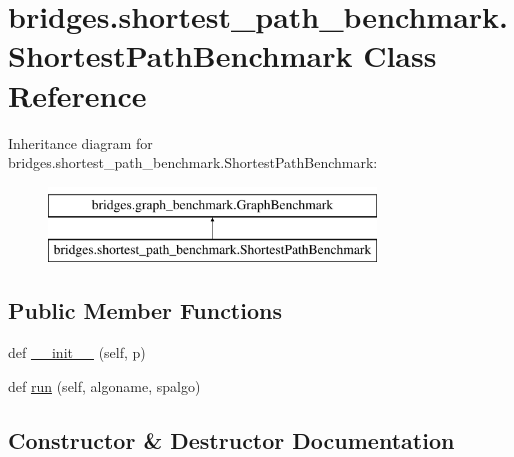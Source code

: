 \hypertarget{classbridges_1_1shortest__path__benchmark_1_1_shortest_path_benchmark}{}\section{bridges.\+shortest\+\_\+path\+\_\+benchmark.\+Shortest\+Path\+Benchmark Class Reference}
\label{classbridges_1_1shortest__path__benchmark_1_1_shortest_path_benchmark}
Inheritance diagram for bridges.\+shortest\+\_\+path\+\_\+benchmark.\+Shortest\+Path\+Benchmark\+:\begin{figure}[H]
\begin{center}
\leavevmode
\includegraphics[height=2.000000cm]{classbridges_1_1shortest__path__benchmark_1_1_shortest_path_benchmark}
\end{center}
\end{figure}
\subsection*{Public Member Functions}
\begin{DoxyCompactItemize}
\item 
def \mbox{\hyperlink{classbridges_1_1shortest__path__benchmark_1_1_shortest_path_benchmark_a708778696f57647d5f8bf94e37297362}{\+\_\+\+\_\+init\+\_\+\+\_\+}} (self, p)
\item 
def \mbox{\hyperlink{classbridges_1_1shortest__path__benchmark_1_1_shortest_path_benchmark_aba41366eff6ee3281ba4decd8d57b089}{run}} (self, algoname, spalgo)
\end{DoxyCompactItemize}


\subsection{Constructor \& Destructor Documentation}
\mbox{\label{classbridges_1_1shortest__path__benchmark_1_1_shortest_path_benchmark_a708778696f57647d5f8bf94e37297362}} 
